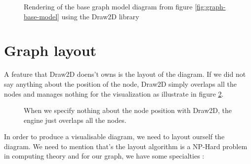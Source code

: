 \begin{figure}[H]
  \centering
  \caption[Render of the base graph model using the Draw2D library]{Rendering of
    the base graph model diagram from figure \ref{fig:graph-base-model} using
    the Draw2D library}
  \label{fig:base-graph-model-html-draw2d}
\end{figure}

\section{Graph layout}
\label{sec:graph-layout}

A feature that Draw2D doens't owns is the layout of the diagram. If we did not
say anything about the position of the node, Draw2D simply overlaps all the nodes
and manages nothing for the visualization as illustrate in figure
\ref{fig:draw2d_overlapping}.

\begin{figure}[H]
  \centering
  \caption[Overlapping of nodes by Draw2D]{When we specify nothing about the
    node position with Draw2D, the engine just overlaps all the nodes.}
  \label{fig:draw2d_overlapping}
\end{figure}

In order to produce a visualisable diagram, we need to layout ourself the
diagram. We need to mention that's the layout algorithm is a NP-Hard problem in
computing theory\cite{Tamassia:2007:HGD:1202383} and for our graph, we have some
specialties :

